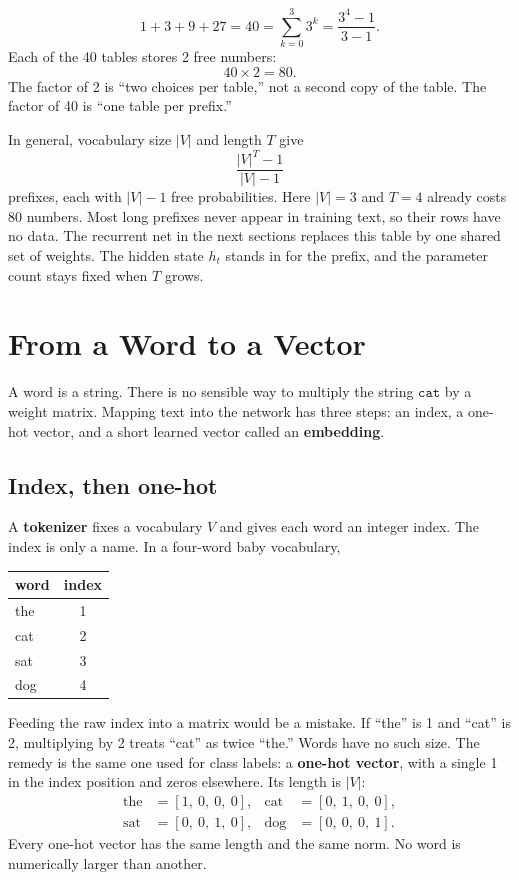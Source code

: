\documentclass[11pt]{article}
\begin{document}
\[
1+3+9+27=40
=
\sum_{k=0}^{3} 3^k
=
\frac{3^4-1}{3-1}.
\]
Each of the 40 tables stores 2 free numbers:
\[
40\times 2=80.
\]
The factor of 2 is ``two choices per table,'' not a second copy of the
table. The factor of 40 is ``one table per prefix.''

In general, vocabulary size \(|V|\) and length \(T\) give
\[
\frac{|V|^T-1}{|V|-1}
\]
prefixes, each with \(|V|-1\) free probabilities. Here \(|V|=3\) and \(T=4\)
already costs 80 numbers. Most long prefixes never appear in training text,
so their rows have no data. The recurrent net in the next sections replaces
this table by one shared set of weights. The hidden state \(h_t\) stands in
for the prefix, and the parameter count stays fixed when \(T\) grows.

\section{From a Word to a Vector}

A word is a string. There is no sensible way to multiply the string
\(\texttt{cat}\) by a weight matrix. Mapping text into the network has
three steps: an index, a one-hot vector, and a short learned vector called
an \textbf{embedding}.

\subsection{Index, then one-hot}

A \textbf{tokenizer} fixes a vocabulary \(V\) and gives each word an integer
index. The index is only a name. In a four-word baby vocabulary,

\begin{center}
\begin{tabular}{@{}lc@{}}
\toprule
word & index \\
\midrule
the & 1 \\
cat & 2 \\
sat & 3 \\
dog & 4 \\
\bottomrule
\end{tabular}
\end{center}

Feeding the raw index into a matrix would be a mistake. If ``the'' is 1 and
``cat'' is 2, multiplying by 2 treats ``cat'' as twice ``the.'' Words have
no such size. The remedy is the same one used for class labels: a
\textbf{one-hot vector}, with a single 1 in the index position and zeros
elsewhere. Its length is \(|V|\):
\begin{align*}
\text{the} &= [1,\ 0,\ 0,\ 0], &
\text{cat} &= [0,\ 1,\ 0,\ 0], \\
\text{sat} &= [0,\ 0,\ 1,\ 0], &
\text{dog} &= [0,\ 0,\ 0,\ 1].
\end{align*}
Every one-hot vector has the same length and the same norm. No word is
numerically larger than another.
\end{document}
